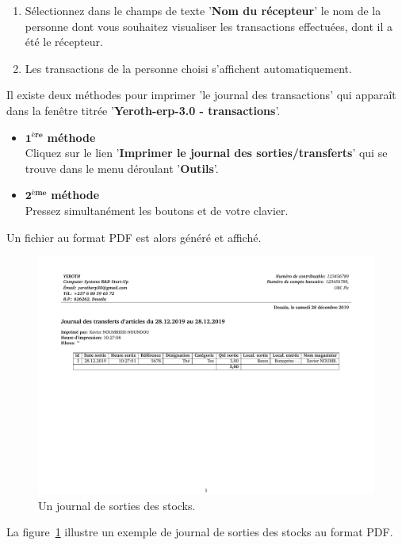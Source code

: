 \begin{enumerate}[1)]
	\item S\'electionnez dans le champs de texte
	'\textbf{Nom du r\'ecepteur}' le nom de la
	personne dont vous souhaitez visualiser
	les transactions effectu\'ees, dont il a \'et\'e
	le r\'ecepteur.
	
	\item Les transactions de la personne choisi
	s'affichent automatiquement.
\end{enumerate}



Il existe deux m\'ethodes pour imprimer 'le journal des
transactions' qui appara\^it dans la fen\^etre titr\'ee
'\textbf{Yeroth-erp-3.0 - transactions}'.

\begin{itemize}[]
	\item \textcolor{purplish}{$\mathbf{1^{\text{\`ere}}}$ \textbf{m\'ethode}}\\
		Cliquez sur le lien
		'\textbf{Imprimer le journal des sorties/transferts}'
		qui se trouve dans le menu d\'eroulant '\textbf{Outils}'.\\

	\item \textcolor{purplish}{$\mathbf{2^{\text{\`eme}}}$ \textbf{m\'ethode}}\\
		Pressez simultan\'ement les boutons 
		et  de votre clavier.
\end{itemize}

Un fichier au format PDF est alors g\'en\'er\'e et affich\'e.

\begin{figure}[!htbp]
	\centering
	\includegraphics[scale=0.55]{images/yeren-journal-sortie-stocks-2017-06-14.pdf}
	\caption{Un journal de sorties des stocks.}
	\label{fig:yeren-journal-sorties-des-stocks}
\end{figure}

La figure~\ref{fig:yeren-journal-sorties-des-stocks} illustre un
exemple de journal de sorties des stocks au format PDF.

